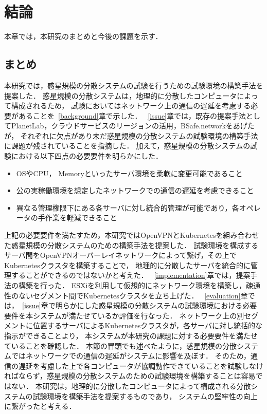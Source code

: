 \chapter{結論}
\label{conclusion}

本章では，本研究のまとめと今後の課題を示す．

\section{まとめ}
\label{conclusion:conclusion}

本研究では，惑星規模の分散システムの試験を行うための試験環境の構築手法を提案した．
惑星規模の分散システムは，地理的に分散したコンピュータによって構成されるため，
試験においてはネットワーク上の通信の遅延を考慮する必要があることを~\ref{background}章で示した．
~\ref{issue}章では，既存の提案手法としてPlanetLab，クラウドサービスのリージョンの活用，BSafe.networkをあげたが，
それぞれに欠点があり未だ惑星規模の分散システムの試験環境の構築手法に課題が残されていることを指摘した．
加えて，惑星規模の分散システムの試験における以下四点の必要要件を明らかにした．
\begin{itemize}
  \item OSやCPU， Memoryといったサーバ環境を柔軟に変更可能であること
  \item 公の実稼働環境を想定したネットワークでの通信の遅延を考慮できること
  \item 異なる管理権限下にある各サーバに対し統合的管理が可能であり，各オペレータの手作業を軽減できること
\end{itemize}
上記の必要要件を満たすため，本研究ではOpenVPNとKubernetesを組み合わせた惑星規模の分散システムのための構築手法を提案した．
試験環境を構成するサーバ間をOpenVPNオーバーレイネットワークによって繋げ，その上でKubernetesクラスタを構築することで，
地理的に分散したサーバを統合的に管理することができるのではないかと考えた．
~\ref{implementation}章では，提案手法の構築を行った．
ESXiを利用して仮想的にネットワーク環境を構築し，疎通性のないセグメント間でKubernetesクラスタを立ち上げた．
~\ref{evaluation}章では，~\ref{issue}章で明らかにした惑星規模の分散システムの試験環境における必要要件を本システムが満たせているか評価を行なった．
ネットワーク上の別セグメントに位置するサーバによるKubernetesクラスタが，各サーバに対し統括的な指示ができることより，
本システムが本研究の課題に対する必要要件を満たせていることを確認した．
本節の冒頭でも述べたように，惑星規模の分散システムではネットワークでの通信の遅延がシステムに影響を及ぼす．
そのため，通信の遅延を考慮した上で各コンピュータが協調動作できていることを試験しなければならず，惑星規模の分散システムのための試験環境を構築することは容易ではない．
本研究は，地理的に分散したコンピュータによって構成される分散システムの試験環境を構築手法を提案するものであり，
システムの堅牢性の向上に繋がったと考える．

